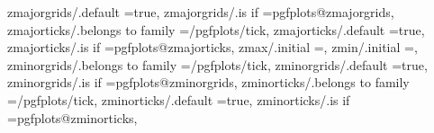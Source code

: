 {{{zmajorgrids/.default                                               =true,                                                                                                                              
zmajorgrids/.is if                                                 =pgfplots@zmajorgrids,                                                                                                              
zmajorticks/.belongs to family                                     =/pgfplots/tick,                                                                                                                    
zmajorticks/.default                                               =true,                                                                                                                              
zmajorticks/.is if                                                 =pgfplots@zmajorticks,                                                                                                              
zmax/.initial                                                      =,                                                                                                                                  
zmin/.initial                                                      =,                                                                                                                                  
zminorgrids/.belongs to family                                     =/pgfplots/tick,                                                                                                                    
zminorgrids/.default                                               =true,                                                                                                                              
zminorgrids/.is if                                                 =pgfplots@zminorgrids,                                                                                                              
zminorticks/.belongs to family                                     =/pgfplots/tick,                                                                                                                    
zminorticks/.default                                               =true,                                                                                                                              
zminorticks/.is if                                                 =pgfplots@zminorticks,                                                                                                              
}}}
